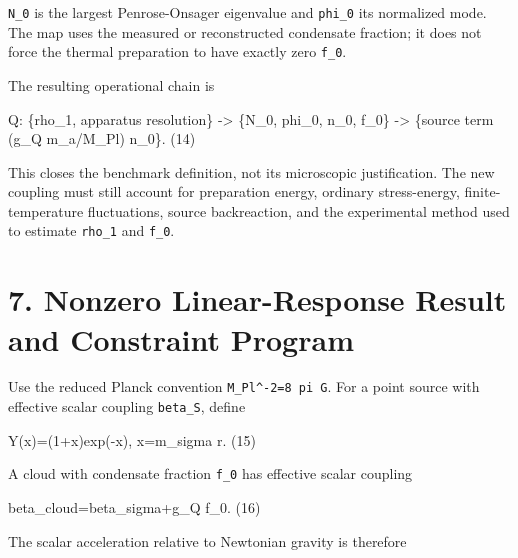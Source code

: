 \documentclass[
  american,
  11pt,
  letterpaper,
]{article}
\newenvironment{Shaded}{}{}
\newcommand{\NormalTok}[1]{#1}
\begin{document}
\texttt{N\_0} is the largest Penrose-Onsager eigenvalue and \texttt{phi\_0} its normalized mode. The map uses the measured or reconstructed condensate fraction; it does not force the thermal preparation to have exactly zero \texttt{f\_0}.

The resulting operational chain is

\begin{Shaded}
\begin{Highlighting}[]
\NormalTok{Q: \{rho\_1, apparatus resolution\}}
\NormalTok{   {-}\textgreater{} \{N\_0, phi\_0, n\_0, f\_0\}}
\NormalTok{   {-}\textgreater{} \{source term (g\_Q m\_a/M\_Pl) n\_0\}.                          (14)}
\end{Highlighting}
\end{Shaded}

This closes the benchmark definition, not its microscopic justification. The new coupling must still account for preparation energy, ordinary stress-energy, finite-temperature fluctuations, source backreaction, and the experimental method used to estimate \texttt{rho\_1} and \texttt{f\_0}.

\section{7. Nonzero Linear-Response Result and Constraint Program}\label{nonzero-linear-response-result-and-constraint-program}

Use the reduced Planck convention \texttt{M\_Pl\^{}-2=8\ pi\ G}. For a point source with effective scalar coupling \texttt{beta\_S}, define

\begin{Shaded}
\begin{Highlighting}[]
\NormalTok{Y(x)=(1+x)exp({-}x),  x=m\_sigma r.                                (15)}
\end{Highlighting}
\end{Shaded}

A cloud with condensate fraction \texttt{f\_0} has effective scalar coupling

\begin{Shaded}
\begin{Highlighting}[]
\NormalTok{beta\_cloud=beta\_sigma+g\_Q f\_0.                                  (16)}
\end{Highlighting}
\end{Shaded}

The scalar acceleration relative to Newtonian gravity is therefore
\end{document}
